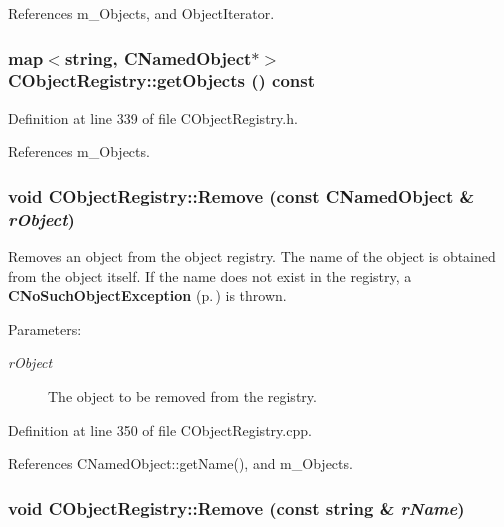 References m\_\-Objects, and Object\-Iterator.
\subsubsection{\setlength{\rightskip}{0pt plus 5cm}map$<$string, {\bf CNamed\-Object}$\ast$$>$ CObject\-Registry::get\-Objects () const\hspace{0.3cm}{\tt  [inline]}}\label{classCObjectRegistry_a2}




Definition at line 339 of file CObject\-Registry.h.

References m\_\-Objects.
\subsubsection{\setlength{\rightskip}{0pt plus 5cm}void CObject\-Registry::Remove (const {\bf CNamed\-Object} \& {\em r\-Object})}\label{classCObjectRegistry_a5}


Removes an object from the object registry. The name of the object is obtained from the object itself. If the name does not exist in the registry, a  {\bf CNo\-Such\-Object\-Exception} {\rm (p.\,\pageref{classCNoSuchObjectException})} is thrown.\begin{Desc}
\item[Parameters: ]\par
\begin{description}
\item[{\em 
r\-Object}]The object to be removed from the registry. \end{description}
\end{Desc}


Definition at line 350 of file CObject\-Registry.cpp.

References CNamed\-Object::get\-Name(), and m\_\-Objects.
\subsubsection{\setlength{\rightskip}{0pt plus 5cm}void CObject\-Registry::Remove (const string \& {\em r\-Name})}\label{classCObjectRegistry_a4}


